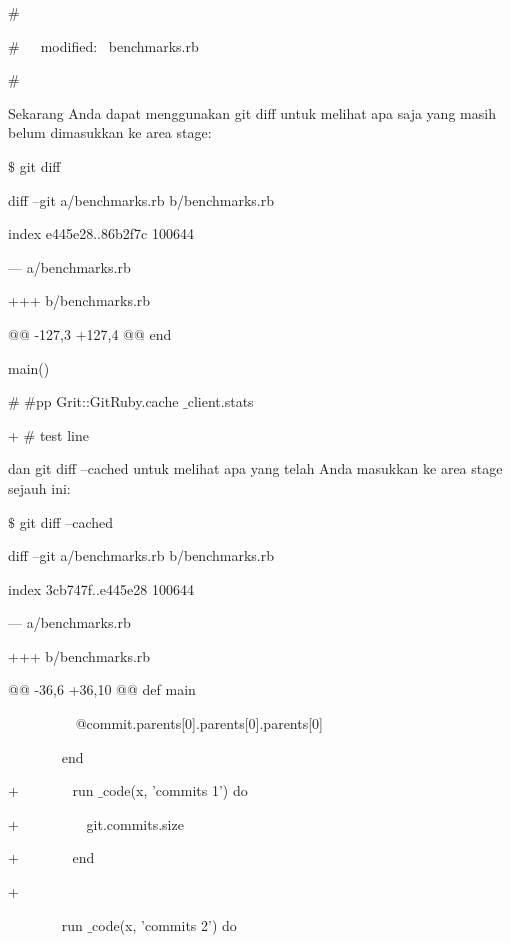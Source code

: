 \noindent 
 $  \#  $ \par
\noindent 
 $  \#  $~~~modified:~  benchmarks.rb \par
\noindent 
 $  \#  $ \par
\noindent 
Sekarang Anda dapat menggunakan git diff untuk melihat apa saja yang masih belum dimasukkan ke area stage: \par
\vspace{12pt}
\noindent 
 $  \$  $ git diff  \par
\noindent 
diff --git a/benchmarks.rb b/benchmarks.rb \par
\noindent 
index e445e28..86b2f7c 100644 \par
\noindent 
--- a/benchmarks.rb \par
\noindent 
+++ b/benchmarks.rb \par
\noindent 
@@ -127,3 +127,4 @@ end \par
\noindent 
 main() \par
\vspace{12pt}
\noindent 
  $  \#  $ $  \#  $pp Grit::GitRuby.cache $  \_  $client.stats  \par
\noindent 
+ $  \#  $ test line \par
\vspace{12pt}
\noindent 
dan git diff --cached untuk melihat apa yang telah Anda masukkan ke area stage sejauh ini: \par
\vspace{12pt}
\noindent 
 $  \$  $ git diff --cached \par
\noindent 
diff --git a/benchmarks.rb b/benchmarks.rb \par
\noindent 
index 3cb747f..e445e28 100644 \par
\noindent 
--- a/benchmarks.rb \par
\noindent 
+++ b/benchmarks.rb \par
\noindent 
@@ -36,6 +36,10 @@ def main \par
\noindent 
~~~~~~~~~ @commit.parents[0].parents[0].parents[0] \par
\noindent 
~~~~~~~ end \par
\vspace{12pt}
\noindent 
+~~~~~~~ run $  \_  $code(x, 'commits 1') do \par
\noindent 
+~~~~~~~~~ git.commits.size \par
\noindent 
+~~~~~~~ end \par
\noindent 
+~~~~~~~~~~~~~  \par
\noindent 
~~~~~~~ run $  \_  $code(x, 'commits 2') do \par
